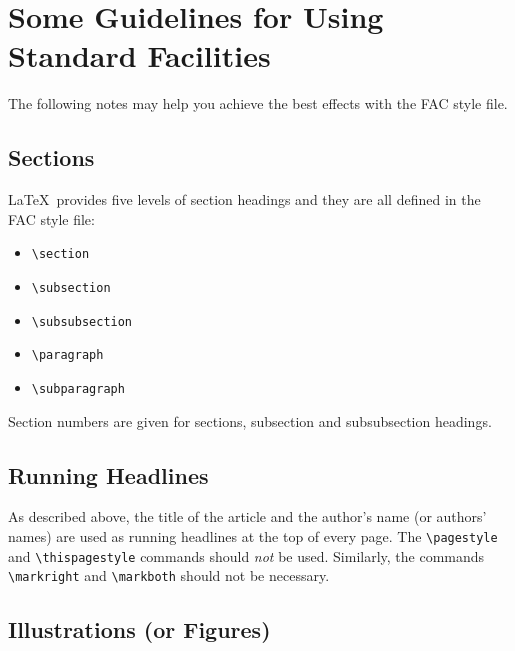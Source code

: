 \section{Some Guidelines for Using Standard Facilities}

The following notes may help you achieve the best effects with the FAC
style file.

\subsection{Sections}

\LaTeX\ provides five levels of section headings and they are all
defined in the FAC style file:
%
\begin{itemize}
  \item \verb"\section"
  \item \verb"\subsection"
  \item \verb"\subsubsection"
  \item \verb"\paragraph"
  \item \verb"\subparagraph"
\end{itemize}
%
Section numbers are given for sections, subsection and subsubsection
headings.

\subsection{Running Headlines}

As described above, the title of the article and the author's name (or
authors' names) are used as running headlines at the top of every page.
The \verb"\pagestyle" and \verb"\thispagestyle" commands should {\em not\/}
be used. Similarly, the commands \verb"\markright" and \verb"\markboth"
should not be necessary.

\subsection{Illustrations (or Figures)}

